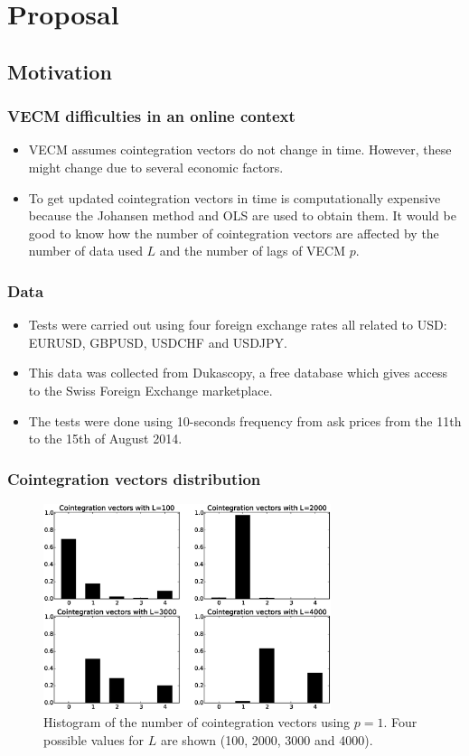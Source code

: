 \documentclass[compress,red]{beamer}
\begin{document}
\section{Proposal}
\subsection{Motivation}
\begin{frame}
\frametitle{VECM difficulties in an online context}
\begin{itemize}
\item VECM assumes cointegration vectors do not change in time. However, these might change due to several economic factors.
\item To get updated cointegration vectors in time is computationally expensive because 
the Johansen method and OLS are used to obtain them. It would be good to know how the number of cointegration vectors are affected by the number of data used $L$ and the number of lags of VECM $p$.
\end{itemize}
\end{frame}


\begin{frame}
\frametitle{Data}
\begin{itemize}
\item Tests were carried out using four foreign exchange rates all related to
USD: EURUSD, GBPUSD, USDCHF and USDJPY. 
\item This data was collected from Dukascopy, a free
database which gives access to the Swiss Foreign Exchange marketplace.
\item The tests were done using 10-seconds frequency from ask prices
from the 11th to the 15th of August 2014. 
\end{itemize}
\end{frame}


\begin{frame}
\frametitle{Cointegration vectors distribution}
\begin{figure}[!h]
  \centering
  \includegraphics[width=0.75\textwidth]{img/histCointVectors-offset20520-p-1-freq-10s}
  \caption{Histogram of the number of cointegration vectors using $p=1$. Four
  possible values for $L$ are shown (100, 2000, 3000 and 4000).}
  \label{fig:hists}
\end{figure}
\end{frame}
\end{document}
